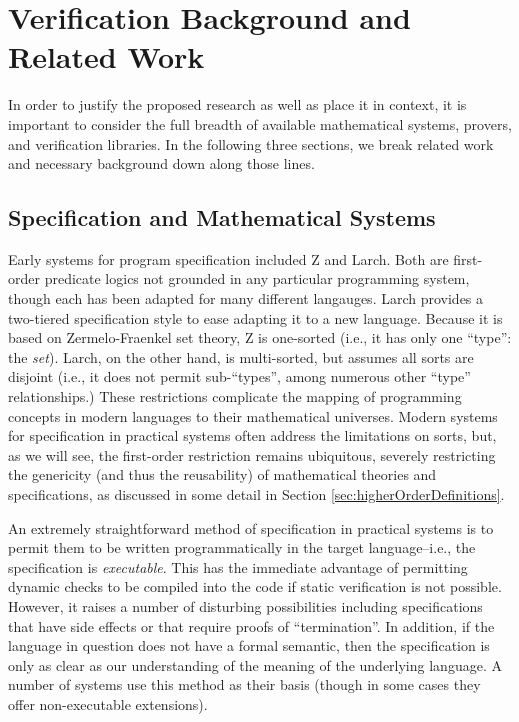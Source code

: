 \section{Verification Background and Related Work}\label{sec:background}

In order to justify the proposed research as well as place it in context, it is important to consider the full breadth of available mathematical systems, provers, and verification libraries.  In the following three sections, we break related work and necessary background down along those lines.

\subsection{Specification and Mathematical Systems}\label{sec:overviewSpec}
Early systems for program specification included Z\cite{dillerZ} and Larch\cite{guttagLarch}.  Both are first-order predicate logics not grounded in any particular programming system, though each has been adapted for many different langauges.  Larch provides a two-tiered specification style to ease adapting it to a new language.  Because it is based on Zermelo-Fraenkel set theory, Z is one-sorted (i.e., it has only one ``type'': the \emph{set}).  Larch, on the other hand, is multi-sorted, but assumes all sorts are disjoint (i.e., it does not permit sub-``types'', among numerous other ``type'' relationships.)  These restrictions complicate the mapping of programming concepts in modern languages to their mathematical universes.  Modern systems for specification in practical systems often address the limitations on sorts, but, as we will see, the first-order restriction remains ubiquitous, severely restricting the genericity (and thus the reusability) of mathematical theories and specifications, as discussed in some detail in Section \ref{sec:higherOrderDefinitions}.

An extremely straightforward method of specification in practical systems is to permit them to be written programmatically in the target language--i.e., the specification is \emph{executable}.  This has the immediate advantage of permitting dynamic checks to be compiled into the code if static verification is not possible.  However, it raises a number of disturbing possibilities including specifications that have side effects or that require proofs of ``termination''.  In addition, if the language in question does not have a formal semantic, then the specification is only as clear as our understanding of the meaning of the underlying language.  A number of systems use this method as their basis (though in some cases they offer non-executable extensions).

